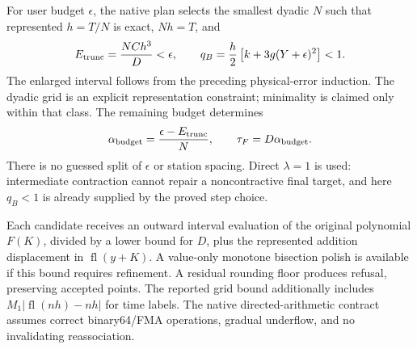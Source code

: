 For user budget $\epsilon$, the native plan selects the smallest dyadic $N$
such that represented $h=T/N$ is exact, $Nh=T$, and
\begin{equation}
E_{\rm trunc}=\frac{NCh^3}{D}<\epsilon,
\qquad q_B=\frac h2\left[k+3g(Y+\epsilon)^2\right]<1.
\end{equation}
The enlarged interval follows from the preceding physical-error induction.
The dyadic grid is an explicit representation constraint; minimality is
claimed only within that class. The remaining budget determines
\begin{equation}
\alpha_{\rm budget}=\frac{\epsilon-E_{\rm trunc}}N,
\qquad \tau_F=D\alpha_{\rm budget}.
\end{equation}
There is no guessed split of $\epsilon$ or station spacing. Direct
$\lambda=1$ is used: intermediate contraction cannot repair a noncontractive
final target, and here $q_B<1$ is already supplied by the proved step choice.

Each candidate receives an outward interval evaluation of the original
polynomial $F(K)$, divided by a lower bound for $D$, plus the represented
addition displacement in $\operatorname{fl}(y+K)$. A value-only monotone
bisection polish is available if this bound requires refinement. A residual
rounding floor produces refusal, preserving accepted points. The reported
grid bound additionally includes $M_1|\operatorname{fl}(nh)-nh|$ for time
labels. The native directed-arithmetic contract assumes correct binary64/FMA
operations, gradual underflow, and no invalidating reassociation.

